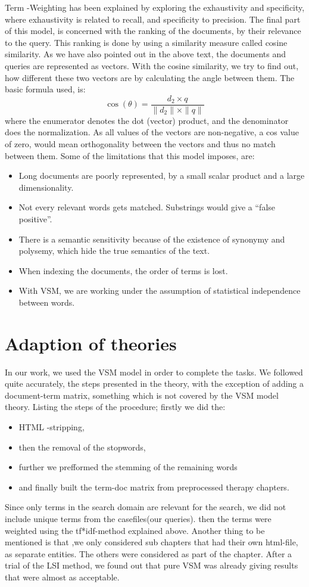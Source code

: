 Term -Weighting  has been explained by exploring the exhaustivity and specificity, where exhaustivity is related to recall, and specificity to precision. 
The final part of this model, is concerned with the ranking of the documents, by their relevance to the query. This ranking is done by using a similarity measure called cosine similarity. As we have also pointed out in the above text, the documents and queries are represented as vectors. With the cosine similarity, we try to find out, how different these two vectors are by calculating the angle between them. The basic formula used, is:
\[
\cos(\theta) = \frac{d_2 \times q}{\parallel d_2 \parallel \times \parallel q \parallel}
\]
where the enumerator denotes the dot (vector) product, and the denominator does the normalization. As all values of the vectors are non-negative, a cos value of zero, would mean orthogonality between the vectors and thus no match between them. 
Some of the limitations that this model imposes, are:
\begin{itemize}
\item{Long documents are poorly represented, by a small scalar product and a large dimensionality.}
\item{Not every relevant words gets matched. Substrings would give a “false positive”.}
\item{There is a semantic sensitivity because of the existence of synonymy and polysemy, which hide the true semantics of the text.}
\item{When indexing the documents, the order of terms is lost.}
\item{With VSM, we are working under the assumption of statistical independence between words.}
\end{itemize}

\section{Adaption of theories}
In our work, we used the VSM model in order to complete the tasks. We followed quite accurately, the steps presented in the theory, with the exception of adding a document-term matrix, something which is not covered by the VSM model theory. Listing the steps of the procedure; firstly we did the:
\begin{itemize}
\item{HTML -stripping,}
\item{then the removal of the stopwords,}
\item{further we prefformed the stemming of the remaining words}
\item{and finally built the term-doc matrix from preprocessed therapy chapters.}
\end{itemize}
Since only terms in the search domain are relevant for the search, we did not include unique terms from the casefiles(our queries).
then the terms were weighted using the tf*idf-method explained above. 
Another thing to be mentioned is that ,we only considered sub chapters that had their own html-file, as separate entities. The others were considered as part of the chapter. 
After a trial of the LSI method, we found out that pure VSM was already giving results that were almost as acceptable. 